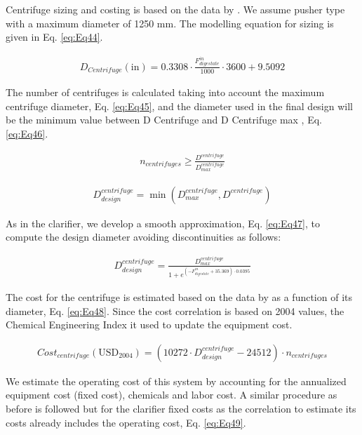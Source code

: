 \begin{refsection}[referencesCh2]
Centrifuge sizing and costing is based on the data by \citet{green2008perry}. We assume pusher type with a maximum diameter of 1250 mm. The modelling equation for sizing is given in Eq. \ref{eq:Eq44}.

\begin{align}
	D_{Centrifuge}\left( \text{in} \right) = 0.3308 \cdot \frac{F_{digestate}^{in}}{1000}\cdot 3600 + 9.5092 \label{eq:Eq44}
\end{align}

The number of centrifuges is calculated taking into account the maximum centrifuge diameter, Eq. \ref{eq:Eq45}, and the diameter used in the final design will be the minimum value between D Centrifuge and D Centrifuge max , Eq. \ref{eq:Eq46}.

\begin{align}
	{n}_{centrifuges} \ge \frac{D^{centrifuge}}{D_{max}^{centrifuge}} \label{eq:Eq45}
\end{align}

\begin{align}
	D_{design}^{centrifuge} = \min \left( {D_{max}^{centrifuge}, D^{centrifuge}} \right) \label{eq:Eq46}
\end{align}

As in the clarifier, we develop a smooth approximation, Eq. \ref{eq:Eq47}, to compute the design diameter avoiding discontinuities as follows:

\begin{align}
	D_{design}^{centrifuge} = \frac{D_{max}^{centrifuge}}{1 + {e^{\left( { -F_{digestate}^{in} + 35.369} \right) \cdot 0.0395}}} \label{eq:Eq47}
\end{align}

The cost for the centrifuge is estimated based on the data by \citet{green2008perry} as a function of its diameter, Eq. \ref{eq:Eq48}. Since the cost correlation is based on 2004 values, the Chemical Engineering Index it used to update the equipment cost.

\begin{align}
	Cost_{centrifuge}\left( \text{USD}_{2004}  \right) = \left( {10272 \cdot D_{design}^{centrifuge} - 24512} \right) \cdot {n}_{centrifuges} \label{eq:Eq48}
\end{align}

We estimate the operating cost of this system by accounting for the annualized equipment cost (fixed cost), chemicals and labor cost. A similar procedure as before is followed \citep{vian1975pronostico} but for the clarifier fixed costs as the correlation to estimate its costs already includes the operating cost, Eq. \ref{eq:Eq49}.


\end{refsection}

